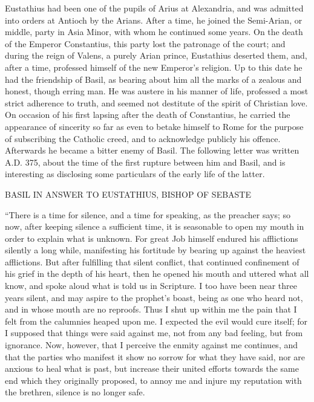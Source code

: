 Eustathius had been one of the pupils of Arius at Alexandria, and
was admitted into orders at Antioch by the Arians. After a time, he
joined the Semi-Arian, or middle, party in Asia Minor, with whom he
continued some years. On the death of the Emperor Constantius, this
party lost the patronage of the court; and during the reign of Valens,
a purely Arian prince, Eustathius deserted them, and, after a time,
professed himself of the new Emperor's religion. Up to this date he
had the friendship of Basil, as bearing about him all the marks of a
zealous and honest, though erring man. He was austere in his manner of
life, professed a most strict adherence to truth, and seemed not
destitute of the spirit of Christian love. On occasion of his first
lapsing after the death of Constantius, he carried the appearance of
sincerity so far as even to betake himself to Rome for the purpose of
subscribing the Catholic creed, and to acknowledge publicly his
offence. Afterwards he became a bitter enemy of Basil. The following
letter was written A.D. 375, about the time of
the first rupture between him and Basil, and is interesting as
disclosing some particulars of the early life of the latter.

BASIL IN ANSWER TO EUSTATHIUS, BISHOP OF SEBASTE

``There is a time for silence, and a time for speaking, as the
preacher says; so now, after keeping silence a sufficient time, it is
seasonable to open my mouth in order to explain what is unknown. For
great Job himself endured his afflictions silently a long while,
manifesting his fortitude by bearing up against the heaviest
afflictions. But after fulfilling that silent conflict, that continued
confinement of his grief in the depth of his heart, then he opened his
mouth and uttered what all know, and spoke aloud what is told us
in Scripture. I too have been near three years
silent, and may aspire to the prophet's boast, being as one who heard
not, and in whose mouth are no reproofs. Thus I shut up within me the
pain that I felt from the calumnies heaped upon me. I expected the
evil would cure itself; for I supposed that things were said against
me, not from any bad feeling, but from ignorance. Now, however, that I
perceive the enmity against me continues, and that the parties who
manifest it show no sorrow for what they have said, nor are anxious to
heal what is past, but increase their united efforts towards the same
end which they originally proposed, to annoy me and injure my
reputation with the brethren, silence is no longer safe.

